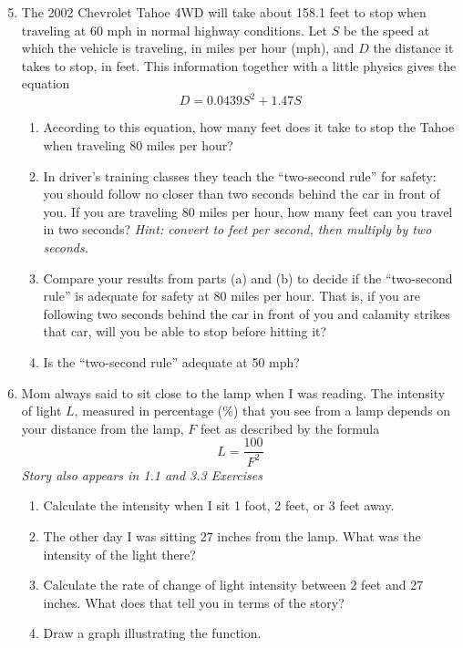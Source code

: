 \begin{enumerate} 
\setcounter{enumi}{4}

\item The 2002 Chevrolet Tahoe 4WD will take about 158.1 feet to stop when traveling at 60 mph in normal highway conditions.  Let $S$ be the speed at which the vehicle is traveling, in miles per hour (mph), and $D$ the distance it takes to stop, in feet.  This information together with a little physics gives the equation $$D = 0.0439S^2 + 1.47S$$
\begin{enumerate}
\item According to this equation, how many feet does it take to stop the Tahoe when traveling 80 miles per hour?
\item In driver's training classes they teach the ``two-second rule'' for safety:  you should follow no closer than two seconds behind the car in front of you.  If you are traveling 80 miles per hour, how many feet can you travel in two seconds?  \emph{Hint: convert to feet per second, then multiply by two seconds.}
\item Compare your results from parts (a) and (b) to decide if the ``two-second rule'' is adequate for safety at 80 miles per hour.  That is, if you are following two seconds behind the car in front of you and calamity strikes that car, will you be able to stop before hitting it?
\item Is the ``two-second rule'' adequate at 50 mph?
\end{enumerate}

\item Mom always said to sit close to the lamp when I was reading.  The intensity of light $L$, measured in percentage (\%) that you see from a lamp depends on your distance from the lamp, $F$ feet as described by the formula $$L=\frac{100}{F^2}$$
 \hfill \emph{Story also appears in 1.1 and 3.3 Exercises}
\begin{enumerate}
\item Calculate the  intensity when I sit 1 foot, 2 feet, or 3 feet away.
\item The other day I was sitting 27 inches from the lamp. What was the intensity of the light there? 
\item Calculate the rate of change of light intensity between 2 feet and 27 inches.  What does that tell you in terms of the story?
\item Draw a graph illustrating the function.
\end{enumerate}


\end{enumerate}
